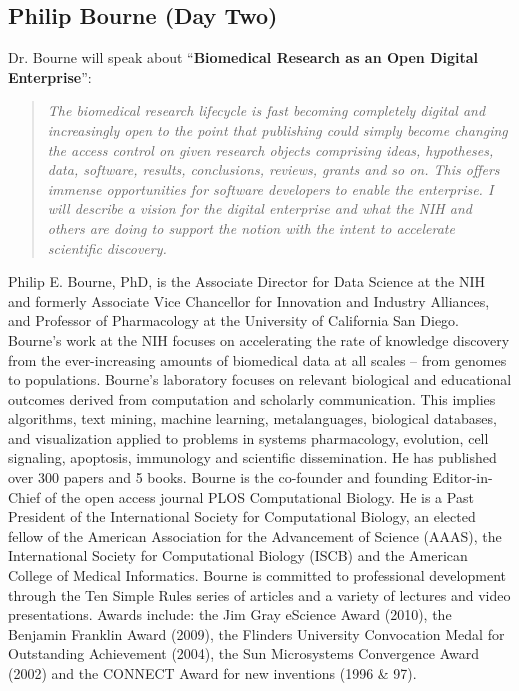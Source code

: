 \documentclass[12pt,oneside]{article}
\begin{document}
\subsection*{Philip Bourne (Day Two)}
\noindent
Dr. Bourne will speak about ``\textbf{Biomedical Research as an Open Digital Enterprise}'':
\begin{quote}
\small
\textit{The biomedical research lifecycle is fast becoming completely digital
and increasingly open to the point that publishing could simply become changing
the access control on given research objects comprising ideas, hypotheses, data,
software, results, conclusions, reviews, grants and so on. This offers immense
opportunities for software developers to enable the enterprise. I will describe
a vision for the digital enterprise and what the NIH and others are doing to
support the notion with the intent to accelerate scientific discovery.}
\end{quote}
Philip E. Bourne, PhD, is the Associate Director for Data Science at the NIH
and formerly Associate Vice Chancellor for Innovation and Industry Alliances,
and Professor of Pharmacology at the University of California San Diego.
Bourne's work at the NIH focuses on accelerating the rate of knowledge
discovery from the ever-increasing amounts of biomedical data at all scales --
from genomes to populations.
Bourne's laboratory focuses on relevant biological and educational outcomes
derived from computation and scholarly communication. This implies algorithms,
text mining, machine learning, metalanguages, biological databases, and
visualization applied to problems in systems pharmacology, evolution, cell
signaling, apoptosis, immunology and scientific dissemination. He has published
over 300 papers and 5 books. Bourne is the co-founder and founding Editor-in-Chief
of the open access journal PLOS Computational Biology. He is a Past President of
the International Society for Computational Biology, an elected fellow of the
American Association for the Advancement of Science (AAAS), the International
Society for Computational Biology (ISCB) and the American College of Medical
Informatics.
Bourne is committed to professional development through the Ten Simple Rules
series of articles and a variety of lectures and video presentations. Awards
include: the Jim Gray eScience Award (2010), the Benjamin Franklin Award (2009),
the Flinders University Convocation Medal for Outstanding Achievement (2004),
the Sun Microsystems Convergence Award (2002) and the CONNECT Award for new
inventions (1996 \& 97).
\end{document}
